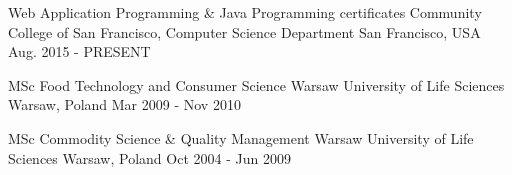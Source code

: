 

\begin{cventries}

  \cventry
    {Web Application Programming \& Java Programming certificates} %
    {Community College of San Francisco, Computer Science Department} %
    {San Francisco, USA} %
    {Aug. 2015 - PRESENT} %
    {}

  \cventry
    {MSc Food Technology and Consumer Science} %
    {Warsaw University of Life Sciences} %
    {Warsaw, Poland} %
    {Mar 2009 - Nov 2010} %
    {}

  \cventry
    {MSc Commodity Science \& Quality Management} %
    {Warsaw University of Life Sciences} %
    {Warsaw, Poland} %
    {Oct 2004 - Jun 2009} %
    {}

\end{cventries}
